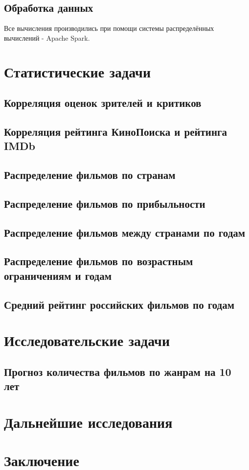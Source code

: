 \documentclass[conference]{IEEEtran}
\begin{document}
\subsection{Обработка данных}

Все вычисления производились при помощи системы распределённых вычислений - Apache Spark.


\section{Статистические задачи}
\subsection{Корреляция оценок зрителей и критиков}
\subsection{Корреляция рейтинга КиноПоиска и рейтинга IMDb}
\subsection{Распределение фильмов по странам}
\subsection{Распределение фильмов по прибыльности}
\subsection{Распределение фильмов между странами по годам}
\subsection{Распределение фильмов по возрастным ограничениям и годам}
\subsection{Средний рейтинг российских фильмов по годам}

\section{Исследовательские задачи}
\subsection{Прогноз количества фильмов по жанрам на 10 лет}

\section{Дальнейшие исследования}

\section{Заключение}
\end{document}
